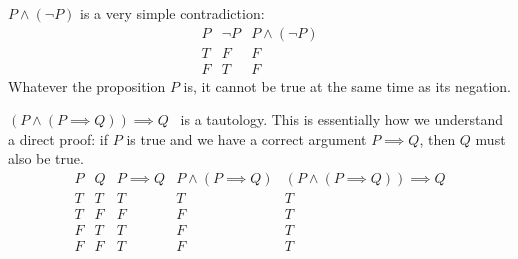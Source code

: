 \begin{examples}
	\item $P\wedge(\neg P)$ is a very simple contradiction:
	\[\begin{array}{cc|c}
	P & \neg P & P\wedge(\neg P)\\\hline
	T & F & F\\
	F & T & F
	\end{array}\]
	Whatever the proposition $P$ is, it cannot be true at the same time as its negation.
	\item $(P\wedge(P\implies Q))\implies Q$ \ is a tautology. This is essentially how we understand a direct proof: if $P$ is true and we have a correct argument $P\implies Q$, then $Q$ must also be true.
	\[\begin{array}{cc|cc|c}
	P & Q & P\implies Q & P\wedge(P\implies Q) & (P\wedge(P\implies Q))\implies Q\\\hline
	T & T & T & T& T\\
	T & F & F & F& T\\
	F & T & T & F& T\\
	F & F & T & F& T
	\end{array}\]
\end{examples}\goodbreak

